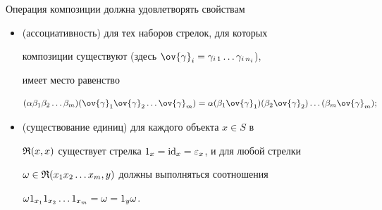 \noindent{}Операция композиции должна удовлетворять свойствам


\begin{itemize}


\item[1)] (ассоциативность) для тех наборов стрелок, для которых


композиции существуют (здесь $\ov{\g}_i=\g_{i\,1}\dotsc \g_{i\, n_i}$),


имеет место равенство


$$


(\al\be_1\be_2\dotsc \be_m) (\ov{\g}_1 \ov{\g}_2 \dotsc \ov{\g}_m)=


\al(\be_1\ov{\g}_1)(\be_2\ov{\g}_2)\dotsc(\be_m\ov{\g}_m);


$$


\item[2)] (существование единиц) для каждого объекта $x\in S$ в


${\frak R}(x,x)$ существует стрелка $1_x=\text{id}_x=\varepsilon_x$, и для любой стрелки


$\omega\in{\frak R}(x_1 x_2\dotsc x_m,y)$ должны выполняться соотношения


$\omega 1_{x_1} 1_{x_2} \dotsc 1_{x_m} =\omega= 1_y\omega$.


\end{itemize}





